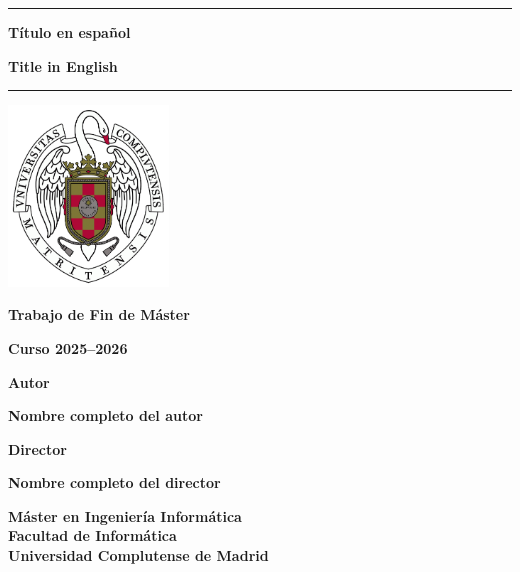 \documentclass[11pt,a4paper]{book}
\begin{document}
\frontmatter
\begin{titlepage}
\centering

\vspace*{1.75cm}

\rule{12cm}{1pt}

{\Large \textbf{Título en español} \par}
{\Large \textbf{Title in English} \par} 

\rule{12cm}{1pt}

\vspace{0.75cm}
\includegraphics[width=4.25cm]{core/logo_ucm.png}
\vspace{0.75cm}

{\Large \textbf{Trabajo de Fin de Máster}} \\
{\Large \textbf{Curso 2025--2026} \par}

\vspace{1cm}
\vfill

{\Large \textbf{Autor}} \\
{\large \textbf{Nombre completo del autor} \par}

\vspace{0.25cm}

{\Large \textbf{Director}} \\
{\large \textbf{Nombre completo del director} \par}

\vspace{0.25cm}

{\large \textbf{Máster en Ingeniería Informática}}\\
{\large \textbf{Facultad de Informática}}\\
{\large \textbf{Universidad Complutense de Madrid}}

\end{titlepage}
\end{document}
